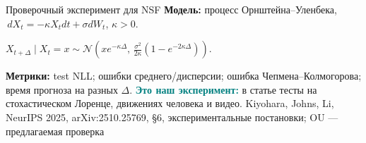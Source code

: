 \documentclass[10pt,aspectratio=169]{beamer}
\newcommand{\nsfsrc}[1]{\vfill{\tiny\color{graytext}Kiyohara, Johns, Li, NeurIPS 2025, arXiv:2510.25769, #1}}
\begin{document}
\begin{frame}{Проверочный эксперимент для NSF}
\vspace{0.08cm}
\textbf{Модель:} процесс Орнштейна--Уленбека,
$\,dX_t=-\kappa X_tdt+\sigma dW_t$, $\kappa>0$.
\vspace{0.07cm}
\begin{center}
$\displaystyle X_{t+\Delta}\mid X_t=x
\sim \mathcal N\!\left(xe^{-\kappa\Delta},\,
\frac{\sigma^2}{2\kappa}(1-e^{-2\kappa\Delta})\right).$
\end{center}
\vspace{0.13cm}
\begin{center}
\end{center}
\vspace{0.13cm}
\textbf{Метрики:} test NLL; ошибки среднего/дисперсии; ошибка Чепмена--Колмогорова; время прогноза на разных $\Delta$.
\vspace{0.06cm}
\small\textcolor{teal}{\bfseries Это наш эксперимент:} в статье тесты на стохастическом Лоренце, движениях человека и видео.
\nsfsrc{\S 6, экспериментальные постановки; OU --- предлагаемая проверка}
\end{frame}
\end{document}
